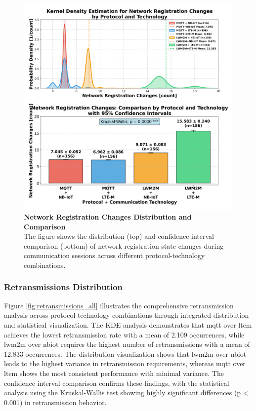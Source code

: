 \documentclass[12pt, english, openany]{book}
\begin{document}
\begin{figure}[htbp]
    \centering
    \includegraphics[width=1.0\textwidth]{network_registration_changes_all_protocol_tech_kde_ci.png}
    \caption{\textbf{Network Registration Changes Distribution and Comparison} \\ The figure shows the distribution (top) and confidence interval comparison (bottom) of network registration state changes during communication sessions across different protocol-technology combinations.}
    \label{fig:network_registration_changes_all}
\end{figure}
\FloatBarrier
\subsubsection*{Retransmissions Distribution} \label{sec:retransmissions_analysis}

Figure \ref{fig:retransmissions_all} illustrates the comprehensive retransmission analysis across protocol-technology combinations through integrated distribution and statistical visualization. The KDE analysis demonstrates that \gls{mqtt} over \gls{ltem} achieves the lowest retransmission rate with a mean of 2.109 occurrences, while \gls{lwm2m} over \gls{nbiot} requires the highest number of retransmissions with a mean of 12.833 occurrences. The distribution visualization shows that \gls{lwm2m} over \gls{nbiot} leads to the highest variance in retransmission requirements, whereas \gls{mqtt} over \gls{ltem} shows the most consistent performance with minimal variance. The confidence interval comparison confirms these findings, with the statistical analysis using the Kruskal-Wallis test showing highly significant differences (p < 0.001) in retransmission behavior.
\end{document}
